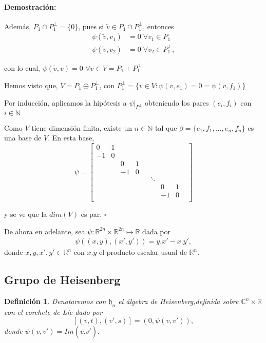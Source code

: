 \documentclass[12pt]{article}
\newtheorem{definition}{Definición}
\newenvironment{proof}{\paragraph{Demostración:}}{\hfill$\square$}
\begin{document}
\begin{proof}
 
 Además, $P_1  \cap P_1^{\bot} = \{0\}$, pues si  $\tilde{v} \in  P_1 \cap P_1^{\bot}$, entonces
 $$\begin{aligned}
 \psi(\tilde{v},v_1)&=0 \;\forall v_1 \in P_1\\ 
 \psi(\tilde{v},v_2)&=0 \;\forall v_2 \in P_1^{\bot},
 \end{aligned}$$
 
 con lo cual, $\psi(\tilde{v},v)=0$ $\forall v \in V=P_1 + P_1^{\bot}$
 
 
Hemos visto que, $V=P_1 \oplus P_1^{\bot}$, con $P_1^{\bot}=\{v \in V : \psi(v,e_1)=0=\psi(v,f_1)\}$

Por inducción, aplicamos la hipótesis a $\psi|_{P_1^{\bot}}$ obteniendo los pares $(e_i,f_i)$ con $i \in \mathbb{N}$

Como $V$ tiene dimensión finita, existe un $n \in \mathbb{N}$ tal que  $\beta=\{e_1,f_1,...,e_n,f_n\}$ es una base de $V$.
En esta base, 
$$\psi = 
\begin{bmatrix}
 0 & 1 & & & & & & &\\ 
 -1& 0 & & & & & & &\\
 & & 0 & 1 & & & & &\\
 & & -1 & 0 & & & & &\\
 & &  &  & & \ddots & & &\\
 & &  &  & & & 0 & 1 &\\
 & &  &  & & & -1 & 0 &\\ 
\end{bmatrix}
$$

y se ve que la $dim(V)$ es par. 
\end{proof}
\newline


De ahora en adelante, sea $\psi :\mathbb{R}^{2n} \times \mathbb{R}^{2n}\mapsto \mathbb{R}$ dada por 
$$ \begin{aligned}
\psi((x,y),(x',y'))=y.x'-x.y' ,
\end{aligned}$$
donde $x,y,x',y' \in \mathbb{R}^n$ con  $x.y$ el producto escalar usual de $\mathbb{R}^n$.

\subsection{Grupo de Heisenberg}
\begin{definition}
Denotaremos con $\mathfrak{h}_n$ el álgebra de Heisenberg,definida sobre
$\mathbb{C}^n \times \mathbb{R}$  con el corchete de Lie dado por 
$$
[(v,t),(v',s)]=(0,\psi(v,v')),
$$
donde  $\psi (v,v')=Im(v.\overline{v'}).$
\end{definition}
\end{document}
